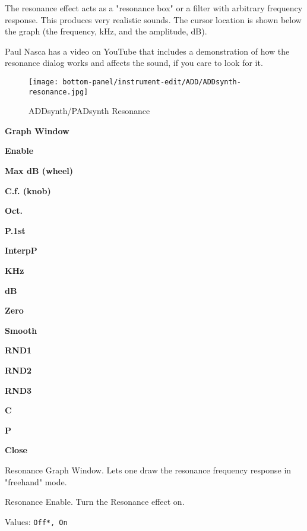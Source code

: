    The resonance effect acts as a "resonance box" or a filter with arbitrary
   frequency response. This produces very realistic sounds. 
   The cursor location is shown below the graph (the frequency, kHz, and
   the amplitude, dB). 

   Paul Nasca has a video on YouTube that includes a demonstration of how
   the resonance dialog works and affects the sound, if you care to look for
   it.

\begin{figure}[H]
   \centering 
   \texttt{[image: bottom-panel/instrument-edit/ADD/ADDsynth-resonance.jpg]}
   \caption{ADDsynth/PADsynth Resonance}
   \label{fig:addsynth_resonance}
\end{figure}

   \begin{enumber}
      \item \textbf{Graph Window}
      \item \textbf{Enable}
      \item \textbf{Max dB (wheel)}
      \item \textbf{C.f. (knob)}
      \item \textbf{Oct.}
      \item \textbf{P.1st}
      \item \textbf{InterpP}
      \item \textbf{KHz}
      \item \textbf{dB}
      \item \textbf{Zero}
      \item \textbf{Smooth}
      \item \textbf{RND1}
      \item \textbf{RND2}
      \item \textbf{RND3}
      \item \textbf{C}
      \item \textbf{P}
      \item \textbf{Close}
   \end{enumber}

   \setcounter{ItemCounter}{0}      %

   Resonance Graph Window.
   Lets one draw the resonance frequency response in "freehand" mode.

   Resonance Enable.
   Turn the Resonance effect on.

   Values: \texttt{Off*, On}

